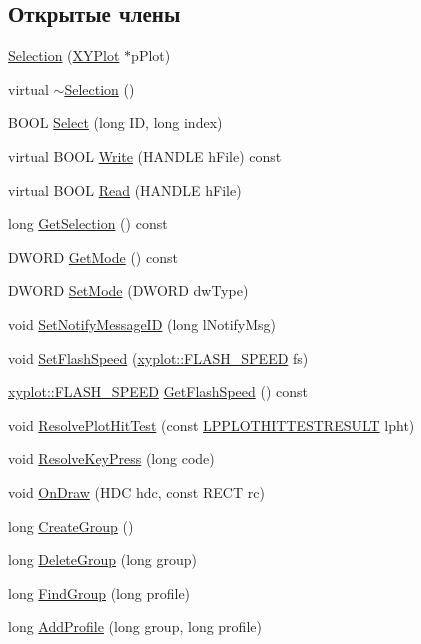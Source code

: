 \subsection*{Открытые члены}
\begin{DoxyCompactItemize}
\item 
\hyperlink{class_selection_a1185435bed19519a7b69ef70c679ce70}{Selection} (\hyperlink{class_x_y_plot}{X\-Y\-Plot} $\ast$p\-Plot)
\item 
virtual \hyperlink{class_selection_a1860ec524d11c03de8c10a9354319839}{$\sim$\-Selection} ()
\item 
B\-O\-O\-L \hyperlink{class_selection_afe20319deb65c06229a512f4be84ccd3}{Select} (long I\-D, long index)
\item 
virtual B\-O\-O\-L \hyperlink{class_selection_a1212e14a73f62170020d426c1a3ee5e9}{Write} (H\-A\-N\-D\-L\-E h\-File) const 
\item 
virtual B\-O\-O\-L \hyperlink{class_selection_a4cf1ce6c3fb26f950075a17c25341110}{Read} (H\-A\-N\-D\-L\-E h\-File)
\item 
long \hyperlink{class_selection_a87021f153bfecc0479530578a3f39f00}{Get\-Selection} () const 
\item 
D\-W\-O\-R\-D \hyperlink{class_selection_a0cf4568ea7c9860937d931146e8b99ae}{Get\-Mode} () const 
\item 
D\-W\-O\-R\-D \hyperlink{class_selection_ab0583b6c9cca3ccfee73e3ce587419da}{Set\-Mode} (D\-W\-O\-R\-D dw\-Type)
\item 
void \hyperlink{class_selection_a75530f8982bd489083764cbfff9eefb3}{Set\-Notify\-Message\-I\-D} (long l\-Notify\-Msg)
\item 
void \hyperlink{class_selection_a9e371db3bdd7a9330f83c427a4bcbf0e}{Set\-Flash\-Speed} (\hyperlink{namespacexyplot_aef2fa49b82f49b1152511044149c60bb}{xyplot\-::\-F\-L\-A\-S\-H\-\_\-\-S\-P\-E\-E\-D} fs)
\item 
\hyperlink{namespacexyplot_aef2fa49b82f49b1152511044149c60bb}{xyplot\-::\-F\-L\-A\-S\-H\-\_\-\-S\-P\-E\-E\-D} \hyperlink{class_selection_acc2eec1158e3379e211994a5b3cb0dba}{Get\-Flash\-Speed} () const 
\item 
void \hyperlink{class_selection_abb12cb9336545b1aa4ec1361e08ab5dc}{Resolve\-Plot\-Hit\-Test} (const \hyperlink{selection_8h_adeea1a4ab82509fdc1235948c4efeef6}{L\-P\-P\-L\-O\-T\-H\-I\-T\-T\-E\-S\-T\-R\-E\-S\-U\-L\-T} lpht)
\item 
void \hyperlink{class_selection_a6af1ac7d7f4a22596146c2942d83f15f}{Resolve\-Key\-Press} (long code)
\item 
void \hyperlink{class_selection_ae15010a7dc9450f394a0823cd7a8053f}{On\-Draw} (H\-D\-C hdc, const R\-E\-C\-T rc)
\item 
long \hyperlink{class_selection_a1961c6f204a1bece5bf33e380c8653bf}{Create\-Group} ()
\item 
long \hyperlink{class_selection_a3d3d974a0ecc9336522ddee10271a1f5}{Delete\-Group} (long group)
\item 
long \hyperlink{class_selection_a29137faa8c9270396be41051cef15d69}{Find\-Group} (long profile)
\item 
long \hyperlink{class_selection_a6048c9afc7c6f5f20af089dd1ca9bb29}{Add\-Profile} (long group, long profile)
\end{DoxyCompactItemize}
